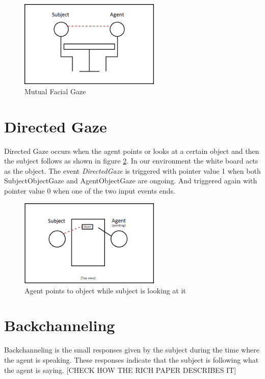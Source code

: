 \documentclass[12pt, a4paper, fleqn]{memoir}%
\begin{document}
\begin{figure}[h!]
    \centering
    \includegraphics[width=0.6\textwidth]{MFG}
    \caption{Mutual Facial Gaze}
    \label{fig:MFG_img}
\end{figure}

\section{Directed Gaze}
\label{sec:DirectedGaze}
Directed Gaze occurs when the agent points or looks at a certain object and then the subject follows as shown in figure \ref{fig:DG_img}. In our environment the white board acts as the object. The event \textit{DirectedGaze} is triggered with pointer value 1 when both SubjectObjectGaze and AgentObjectGaze are ongoing. And triggered again with pointer value 0 when one of the two input events ends.

\begin{figure}[h!]
    \centering
    \includegraphics[width=0.6\textwidth]{DG}
    \caption{Agent points to object while subject is looking at it}
    \label{fig:DG_img}
\end{figure}

\section{Backchanneling}
\label{sec:Backchanneling}
Backchanneling is the small responses given by the subject during the time where the agent is speaking. These responses indicate that the subject is following what the agent is saying. [CHECK HOW THE RICH PAPER DESCRIBES IT]
\end{document}

